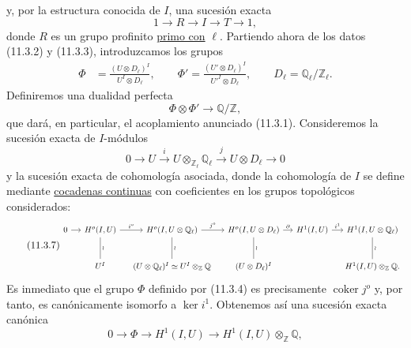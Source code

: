 y, por la estructura conocida de $I$, una sucesión exacta
\begin{equation}\tag{11.3.3}
1\longrightarrow R\longrightarrow I\longrightarrow T\longrightarrow1,
\end{equation}
donde $R$ es un grupo profinito \underline{primo con} $\ell$. Partiendo
ahora de los datos (11.3.2) y (11.3.3), introduzcamos los grupos
\begin{equation}\tag{11.3.4}
\begin{aligned}
\Phi&=\frac{(U\otimes D_\ell)^I}{U^I\otimes D_\ell},\qquad
\Phi'=\frac{(U'\otimes D_\ell)^I}{{U'}^I\otimes D_\ell},\qquad
D_\ell=\mathbb Q_\ell/\mathbb Z_\ell.
\end{aligned}
\end{equation}
Definiremos una dualidad perfecta
\begin{equation}\tag{11.3.5}
\Phi\otimes\Phi'\longrightarrow\mathbb Q/\mathbb Z,
\end{equation}
que dará, en particular, el acoplamiento anunciado (11.3.1).
Consideremos la sucesión exacta de $I$-módulos
\begin{equation}\tag{11.3.6}
0\longrightarrow U\xrightarrow{\ i\ }
 U\otimes_{\mathbb Z_\ell}\mathbb Q_\ell
 \xrightarrow{\ j\ }U\otimes D_\ell\longrightarrow0
\end{equation}
y la sucesión exacta de cohomología asociada, donde la cohomología de
$I$ se define mediante \underline{cocadenas continuas} con coeficientes
en los grupos topológicos considerados:
\begin{equation}\tag{11.3.7}
\resizebox{\textwidth}{!}{%
\begin{tikzcd}[ampersand replacement=\&, column sep=small, row sep=large]
0 \arrow[r]
 \& H^o(I,U) \arrow[r, "i^o"] \arrow[d, no head, "\wr"]
 \& H^o(I,U\otimes\mathbb Q_\ell) \arrow[r, "j^o"]
      \arrow[d, no head, "\wr"]
 \& H^o(I,U\otimes D_\ell) \arrow[r, "\partial"]
      \arrow[d, no head, "\wr"]
 \& H^1(I,U) \arrow[r, "i^1"]
 \& H^1(I,U\otimes\mathbb Q_\ell) \arrow[d, no head, "\wr"] \\
{}
 \& U^I
 \& (U\otimes\sisi{Q_\ell}{\mathbb Q_\ell})^I\simeq U^I\otimes_{\mathbb Z}\mathbb Q
 \& (U\otimes D_\ell)^I
 \& {}
 \& H^1(I,U)\otimes_{\mathbb Z}\mathbb Q .
\end{tikzcd}}
\end{equation}
Es inmediato que el grupo $\Phi$ definido por (11.3.4) es precisamente
$\operatorname{coker}j^o$ y, por tanto, es canónicamente isomorfo a
$\ker i^1$. Obtenemos así una sucesión exacta canónica
\begin{equation}\tag{11.3.8}
0\longrightarrow\Phi\longrightarrow H^1(I,U)
 \longrightarrow H^1(I,U)\otimes_{\mathbb Z}\mathbb Q,
\end{equation}

